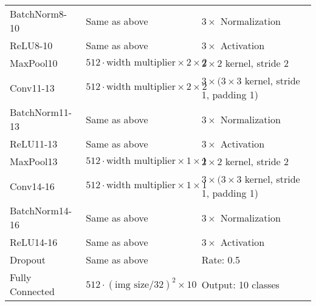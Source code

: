 \begin{table}[h]
\begin{tabular}{lll}
    BatchNorm8-10 & Same as above & $3 \times$ Normalization \\
    ReLU8-10 & Same as above & $3 \times$ Activation \\
    MaxPool10 & $512 \cdot \text{width multiplier} \times 2 \times 2$ & $2 \times 2$ kernel, stride 2 \\
    Conv11-13 & $512 \cdot \text{width multiplier} \times 2 \times 2$ & $3 \times (3 \times 3$ kernel, stride 1, padding 1) \\
    BatchNorm11-13 & Same as above & $3 \times$ Normalization \\
    ReLU11-13 & Same as above & $3 \times$ Activation \\
    MaxPool13 & $512 \cdot \text{width multiplier} \times 1 \times 1$ & $2 \times 2$ kernel, stride 2 \\
    Conv14-16 & $512 \cdot \text{width multiplier} \times 1 \times 1$ & $3 \times (3 \times 3$ kernel, stride 1, padding 1) \\
    BatchNorm14-16 & Same as above & $3 \times$ Normalization \\
    ReLU14-16 & Same as above & $3 \times$ Activation \\
    Dropout & Same as above & Rate: 0.5 \\
    Fully Connected & $512 \cdot (\text{img size}/32)^2 \times 10$ & Output: 10 classes \\
    \bottomrule
    \end{tabular}
\end{table}
